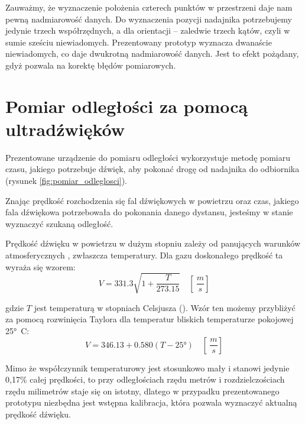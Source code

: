 Zauważmy, że wyznaczenie położenia czterech punktów w przestrzeni daje nam pewną nadmiarowość
danych. Do wyznaczenia pozycji nadajnika potrzebujemy jedynie trzech współrzędnych,
a dla orientacji -- zaledwie trzech kątów, czyli w sumie sześciu niewiadomych.
Prezentowany prototyp wyznacza  dwanaście niewiadomych, co daje dwukrotną nadmiarowość danych.
Jest to efekt pożądany, gdyż pozwala na korektę błędów pomiarowych.


\section{Pomiar odległości za pomocą ultradźwięków}

Prezentowane urządzenie do pomiaru odległości wykorzystuje metodę pomiaru czasu, jakiego
potrzebuje dźwięk, aby pokonać drogę od nadajnika do odbiornika
(rysunek \ref{fig:pomiar_odleglosci}).

Znając prędkość rozchodzenia się fal dźwiękowych w powietrzu oraz czas, jakiego fala dźwiękowa potrzebowała
do pokonania danego dystansu, jesteśmy w stanie wyznaczyć szukaną odległość.

Prędkość dźwięku w powietrzu w dużym stopniu zależy od panujących warunków atmosferycznych \cite{bib:soundSpeed},
zwłaszcza temperatury.
Dla gazu doskonałego prędkość ta wyraża się wzorem:
\[
V = \num{331,3}  \sqrt{1+\frac{T}{\num{273,15}}} \quad \left[ \SI{}{\frac{m}{s}} \right]
\]

gdzie $T$ jest temperaturą w stopniach Celsjusza (\SI{}{\degC}).
Wzór ten możemy przybliżyć za pomocą rozwinięcia Taylora dla temperatur bliskich temperaturze pokojowej \ang{25}\SI{}{C}:
\[
 V = \num{346,13}  +  \num{0,580}(T - \ang{25})  \quad \left[ \SI{}{ \frac{m}{s}} \right]
\]

Mimo że współczynnik temperaturowy jest stosunkowo mały i stanowi jedynie 0,17\% całej prędkości,
to przy odległościach rzędu metrów i rozdzielczościach rzędu milimetrów staje się on istotny, 
dlatego w przypadku prezentowanego prototypu niezbędna jest wstępna kalibracja, która pozwala
wyznaczyć aktualną prędkość dźwięku.





